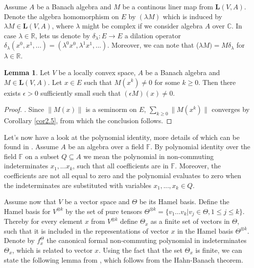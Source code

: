 \documentclass[12pt,a4paper]{report}
\theoremstyle{definition}
\newtheorem{lemma}{Lemma}
\begin{document}
Assume $A$ be a Banach algebra and $M$ be a continous liner map from $\textbf{L}(V, A)$. Denote the algebra homomorphism on $E$ by $(\lambda M)$ which is induced by $\lambda M\in \textbf{L}(V, A)$, where $\lambda$ might be complex if we consider algebra $A$ over $\mathbb{C}$. In case $\lambda \in \mathbb{R}$, lets us denote by $\delta_\lambda :E \rightarrow E$ a dilation operator $\delta_\lambda(x^0,x^1,...)=(\lambda^0 x^0,\lambda^1 x^1,...)$. Moreover, we can note that ($\lambda M)=M\delta_\lambda$ for $\lambda \in \mathbb{R}$.

\begin{lemma}\label{lemmma4.3}
	Let $V$ be a locally convex space, $A$ be a Banach algebra and $M \in \textbf{L}(V, A)$. Let $x \in E$ such that $M(x^k) \neq 0$ for some $k \geq 0$. Then there exists $\epsilon > 0$ sufficiently	small such that $(\epsilon M)(x) \neq 0$.
\end{lemma}

\begin{proof}\parencite[see][]{chevyrev2016characteristic}.
	Since $\lVert M(x)\rVert$ is a seminorm on $E$, $\sum_{k \geq 0}\lVert M(x^k)\rVert$ converges by Corollary \ref{cor2.5}, from which the conclusion follows.
\end{proof}

Let's now have a look at the polynomial identity, more details of which can be found in \parencite{giambruno2005polynomial}. Assume $A$ be an algebra over a field $\mathbb{F}$. By polynomial identity over the field $\mathbb{F}$ on a subset $Q \subseteq A$ we mean the polynomial in non-commuting indeterminates $x_1,...x_k$, such that all coefficients are in $\mathbb{F}$. Moreover, the coefficients are not all equal to zero and the polynomial evaluates to zero when the indeterminates are substituted with variables $x_1, . . . , x_k \in Q$.


Assume now that $V$ be a vector space and $\Theta$ be its Hamel basis. %
 Define the Hamel basis for $V^{\otimes k}$ by the set of pure tensors $\Theta^{\otimes k}=\{v_1 . . . v_k | v_j \in \Theta, 1 \leq j \leq k\}$. Thereby for every element $x$ from $V^{\otimes k}$ define $\Theta_x$ as a finite set of vectors in $\Theta$, such that it is included in the representations of vector $x$ in the Hamel basis $\Theta^{\otimes k}$. Denote by $f_x^\Theta$ the canonical formal non-commuting polynomial in indeterminates $\Theta_x$, which is related to vector $x$. Using the fact that the set $\Theta_x$ is finite, we can state the following lemma from \parencite{chevyrev2016characteristic}, which follows from the Hahn-Banach theorem.
\end{document}

